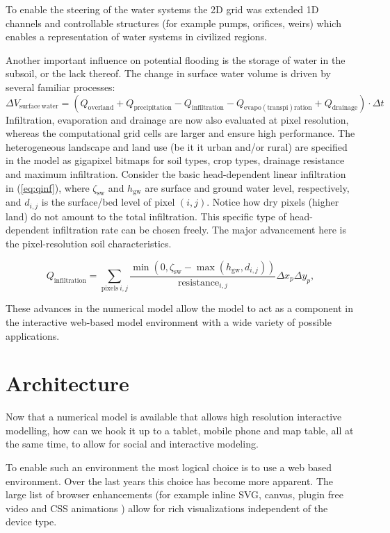 \documentclass[a4paper]{article}
\begin{document}
To enable the steering of the water systems the 2D grid was extended 1D channels and controllable structures (for example pumps, orifices, weirs) which enables a representation of water systems in civilized regions.

Another important influence on potential flooding is the storage of water in the subsoil, or the lack thereof. The change in surface water volume is driven by several familiar processes:
\[
\Delta V_\mathrm{surface\ water}=(Q_\mathrm{overland} + Q_\mathrm{precipitation} - Q_\mathrm{infiltration} - Q_\mathrm{evapo(transpi)ration} + Q_\mathrm{drainage})\cdot\Delta t
\]
Infiltration, evaporation and drainage are now also evaluated at pixel resolution, whereas the computational grid cells are larger and ensure high performance. The heterogeneous landscape and land use (be it it urban and/or rural) are specified in the model as gigapixel bitmaps for soil types, crop types, drainage resistance and maximum infiltration. Consider the basic head-dependent linear infiltration in (\ref{eq:qinf}), where $\zeta_\mathrm{sw}$ and $h_\mathrm{gw}$ are surface and ground water level, respectively, and $d_{i,j}$ is the surface/bed level of pixel $(i,j)$. Notice how dry pixels (higher land) do not amount to the total infiltration. This specific type of head-dependent infiltration rate can be chosen freely. The major advancement here is the pixel-resolution soil characteristics.

\begin{equation}
\label{eq:qinf}
Q_\mathrm{infiltration}= \sum_{\mathrm{pixels}\ i,j} \frac{\min(0, \zeta_\mathrm{sw}-\max(h_\mathrm{gw}, d_{i,j}))}{\mathrm{resistance}_{i,j}}\Delta x_p \Delta y_p,
\end{equation}


These advances in the numerical model allow the model to act as a component in the interactive web-based model environment with a wide variety of possible applications.


\section{Architecture}
Now that a numerical model is available that allows high resolution interactive modelling, how can we hook it up to a tablet, mobile phone and map table, all at the same time, to allow for social and interactive modeling.

To enable such an environment the most logical choice is to use a web based environment. Over the last years this choice has become more apparent. The large list of browser enhancements (for example inline \ac{SVG}, canvas, plugin free video \citep{Berjon2014} and \ac{CSS} animations \citep{Jackson2013}) allow for rich visualizations independent of the device type.
\end{document}
